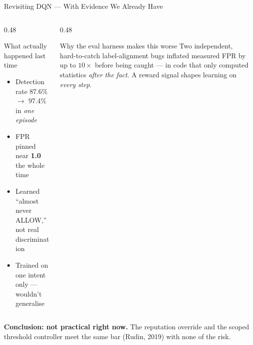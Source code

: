 \documentclass[aspectratio=169, 12pt]{beamer}
\begin{document}
\begin{frame}{Revisiting DQN — With Evidence We Already Have}
  \begin{columns}[T]
    \begin{column}{0.48\textwidth}
      \begin{alertblock}{What actually happened last time}
        \begin{itemize}
          \item Detection rate 87.6\% $\to$ 97.4\% in \emph{one episode}
          \item FPR pinned near \textbf{1.0} the whole time
          \item Learned ``almost never ALLOW,'' not real discrimination
          \item Trained on one intent only — wouldn't generalise
        \end{itemize}
      \end{alertblock}
    \end{column}
    \begin{column}{0.48\textwidth}
      \begin{alertblock}{Why the eval harness makes this worse}
        Two independent, hard-to-catch label-alignment bugs inflated
        measured FPR by up to $10\times$ before being caught — in code
        that only computed statistics \emph{after the fact}. A reward
        signal shapes learning on \emph{every step}.
      \end{alertblock}
    \end{column}
  \end{columns}
  \vspace{0.4cm}
  \begin{center}
    \large\textcolor{honeyblue}{\textbf{Conclusion: not practical right now.}
    The reputation override and the scoped threshold controller meet the
    same bar (Rudin, 2019) with none of the risk.}
  \end{center}
\end{frame}
\end{document}
